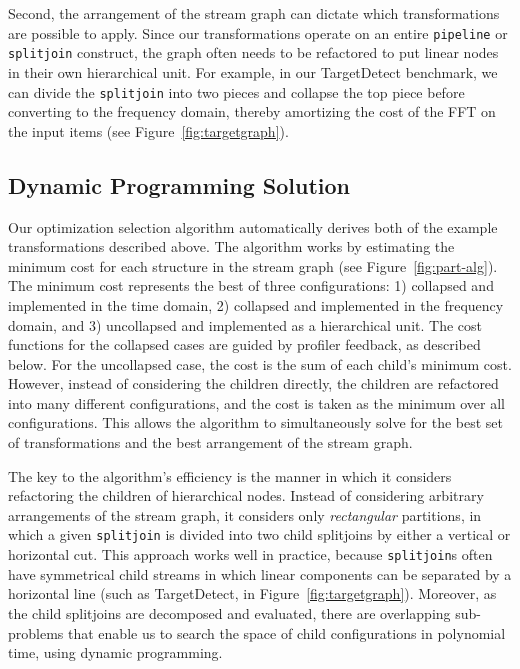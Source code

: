 Second, the arrangement of the stream graph can dictate which
transformations are possible to apply.  Since our transformations
operate on an entire {\tt pipeline} or {\tt splitjoin} construct, the
graph often needs to be refactored to put linear nodes in their own
hierarchical unit.  For example, in our TargetDetect benchmark, we can
divide the {\tt splitjoin} into two pieces and collapse the top piece
before converting to the frequency domain, thereby amortizing the cost
of the FFT on the input items (see Figure~\ref{fig:targetgraph}).

\subsection{Dynamic Programming Solution}

Our optimization selection algorithm automatically derives both of the
example transformations described above.  The algorithm works by
estimating the minimum cost for each structure in the stream graph
(see Figure~\ref{fig:part-alg}).  The minimum cost represents the best
of three configurations: 1) collapsed and implemented in the time
domain, 2) collapsed and implemented in the frequency domain, and 3)
uncollapsed and implemented as a hierarchical unit.  The cost
functions for the collapsed cases are guided by profiler feedback, as
described below.  For the uncollapsed case, the cost is the sum of
each child's minimum cost.  However, instead of considering the
children directly, the children are refactored into many different
configurations, and the cost is taken as the minimum over all
configurations.  This allows the algorithm to simultaneously solve for
the best set of transformations and the best arrangement of the stream
graph.

The key to the algorithm's efficiency is the manner in which it
considers refactoring the children of hierarchical nodes.  Instead of
considering arbitrary arrangements of the stream graph, it considers
only {\it rectangular} partitions, in which a given {\tt splitjoin} is
divided into two child splitjoins by either a vertical or horizontal
cut.  This approach works well in practice, because {\tt splitjoin}s
often have symmetrical child streams in which linear components can be
separated by a horizontal line (such as TargetDetect, in
Figure~\ref{fig:targetgraph}).  Moreover, as the child splitjoins are
decomposed and evaluated, there are overlapping sub-problems that
enable us to search the space of child configurations in polynomial
time, using dynamic programming.

